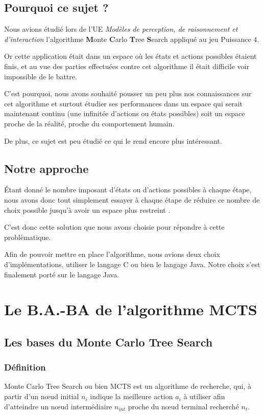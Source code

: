 \documentclass[pdftex,french, english]{article}	%
\begin{document}
	\subsection{Pourquoi ce sujet ?}
	Nous avions étudié lors de l'UE \textit{Modèles de perception, de raisonnement et d’interaction} l'algorithme \textbf{M}onte \textbf{C}arlo \textbf{T}ree \textbf{S}earch \cite{coulom01} appliqué au jeu Puissance $4$. 

	Or cette application était dans un espace où les états et actions possibles étaient finis, et au vue des parties effectuées contre cet algorithme il était difficile voir impossible de le battre. 

	C'est pourquoi, nous avons souhaité pousser un peu plus nos connaissances sur cet algorithme et surtout étudier ses performances dans un espace qui serait maintenant continu (une infinitée d'actions ou états possibles) soit un espace proche de la réalité, proche du comportement humain. 

	De plus, ce sujet est peu étudié ce qui le rend encore plus intéressant.
	
	\subsection{Notre approche}
	Étant donné le nombre imposant d'états ou d'actions possibles à chaque étape, nous avons donc tout simplement essayer à chaque étape de réduire ce nombre de choix possible jusqu'à avoir un espace plus restreint \cite{couetoux01}.

	C'est donc cette solution que nous avons choisie pour répondre à cette problèmatique. 

	Afin de pouvoir mettre en place l'algorithme, nous avions deux choix d'implémentations, utiliser le langage C ou bien le langage Java. Notre choix s'est finalement porté sur le langage Java.
\newpage





\section{Le B.A.-BA de l'algorithme MCTS}
	\subsection{Les bases du Monte Carlo Tree Search}
	\subsubsection{Définition}
	Monte Carlo Tree Search ou bien MCTS est un algorithme de recherche, qui, à partir d'un nœud initial $n_{i}$ indique la meilleure action $a_i$ à utiliser afin d'atteindre un nœud intermédiaire $n_{int}$ proche du nœud terminal recherché $n_{t}$. 
\end{document}
